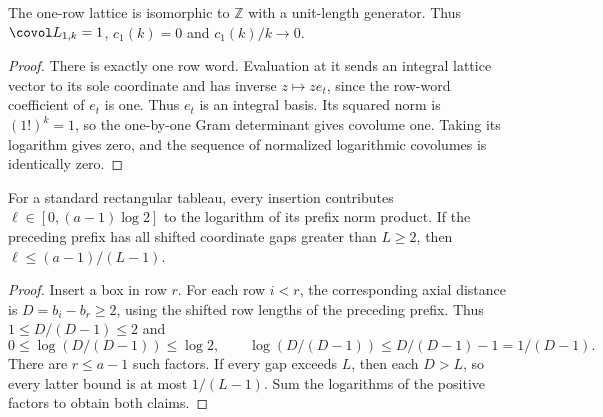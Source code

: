 \begin{lemma}
\label{lem:one-row-covolume}
\leanok
The one-row lattice is isomorphic to $\mathbb Z$ with a unit-length
generator. Thus $\covol L_{1,k}=1$, $c_1(k)=0$ and
$c_1(k)/k\to0$.
\end{lemma}
\begin{proof}
There is exactly one row word. Evaluation at it sends an integral
lattice vector to its sole coordinate and has inverse
$z\mapsto z e_t$, since the row-word coefficient of $e_t$ is one.
Thus $e_t$ is an integral basis. Its squared norm is $(1!)^k=1$,
so the one-by-one Gram determinant gives covolume one. Taking its
logarithm gives zero, and the sequence of normalized logarithmic
covolumes is identically zero.
\end{proof}

\begin{lemma}
\label{lem:log-insertion-bounds}
\leanok
For a standard rectangular tableau, every insertion contributes
$\ell\in[0,(a-1)\log2]$ to the logarithm of its prefix norm product.
If the preceding prefix has all shifted coordinate gaps greater than
$L\geq2$, then $\ell\leq(a-1)/(L-1)$.
\end{lemma}
\begin{proof}
Insert a box in row $r$. For each row $i<r$, the corresponding
axial distance is $D=b_i-b_r\geq2$, using the shifted row lengths
of the preceding prefix. Thus $1\leq D/(D-1)\leq2$ and
\[
 0\leq\log(D/(D-1))\leq\log2,\qquad
 \log(D/(D-1))\leq D/(D-1)-1=1/(D-1).
\]
There are $r\leq a-1$ such factors. If every gap exceeds $L$,
then each $D>L$, so every latter bound is at most $1/(L-1)$.
Sum the logarithms of the positive factors to obtain both claims.
\end{proof}

